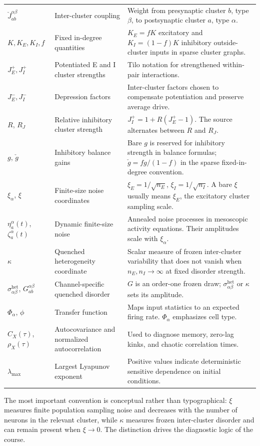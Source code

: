 \begin{longtable}{@{}p{}p{}p{}@{}}
\(\check J_{ab}^{\alpha\beta}\) & Inter-cluster coupling & Weight from presynaptic cluster \(b\), type \(\beta\), to postsynaptic cluster \(a\), type \(\alpha\). \\
\(K,K_E,K_I,f\) & Fixed in-degree quantities & \(K_E=fK\) excitatory and \(K_I=(1-f)K\) inhibitory outside-cluster inputs in sparse cluster graphs. \\
\(J_E^+,J_I^+\) & Potentiated E and I cluster strengths & Tilo notation for strengthened within-pair interactions. \\
\(J_E^-,J_I^-\) & Depression factors & Inter-cluster factors chosen to compensate potentiation and preserve average drive. \\
\(R\), \(R_J\) & Relative inhibitory cluster strength & \(J_I^+=1+R(J_E^+-1)\). The source alternates between \(R\) and \(R_J\). \\
\(g\), \(\check g\) & Inhibitory balance gains & Bare \(g\) is reserved for inhibitory strength in balance formulas; \(\check g=fg/(1-f)\) in the sparse fixed-in-degree convention. \\
\(\xi_\alpha\), \(\xi\) & Finite-size noise coordinates & \(\xi_E=1/\sqrt{n_E}\), \(\xi_I=1/\sqrt{n_I}\). A bare \(\xi\) usually means \(\xi_E\), the excitatory cluster sampling scale. \\
\(\eta_a^\alpha(t)\), \(\zeta_a^\alpha(t)\) & Dynamic finite-size noise & Annealed noise processes in mesoscopic activity equations. Their amplitudes scale with \(\xi_\alpha\). \\
\(\kappa\) & Quenched heterogeneity coordinate & Scalar measure of frozen inter-cluster variability that does not vanish when \(n_E,n_I\to\infty\) at fixed disorder strength. \\
\(\sigma_{\alpha\beta}^{\mathrm{het}}\), \(G_{ab}^{\alpha\beta}\) & Channel-specific quenched disorder & \(G\) is an order-one frozen draw; \(\sigma_{\alpha\beta}^{\mathrm{het}}\) or \(\kappa\) sets its amplitude. \\
\(\Phi_\alpha\), \(\phi\) & Transfer function & Maps input statistics to an expected firing rate. \(\Phi_\alpha\) emphasizes cell type. \\
\(C_X(\tau)\), \(\rho_X(\tau)\) & Autocovariance and normalized autocorrelation & Used to diagnose memory, zero-lag kinks, and chaotic correlation times. \\
\(\lambda_{\max}\) & Largest Lyapunov exponent & Positive values indicate deterministic sensitive dependence on initial conditions. \\
\bottomrule
\end{longtable}

The most important convention is conceptual rather than typographical:
\(\xi\) measures finite population sampling noise and decreases with the
number of neurons in the relevant cluster, while \(\kappa\) measures frozen
inter-cluster disorder and can remain present when \(\xi\to 0\). The
distinction drives the diagnostic logic of the course.
